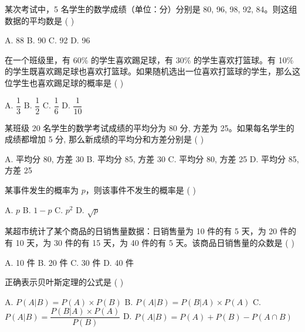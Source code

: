 \documentclass[11pt, a4paper]{article}
\begin{document}

\begin{baitap}[1]
某次考试中，5 名学生的数学成绩（单位：分）分别是 80, 96, 98, 92, 84。则这组数据的平均数是 ( )
\par\vspace{3pt}
\noindent A. 88 \quad B. 90 \quad C. 92 \quad D. 96
\end{baitap}

\begin{baitap}[2]
在一个班级里，有 60\% 的学生喜欢踢足球，有 30\% 的学生喜欢打篮球。有 10\% 的学生既喜欢踢足球也喜欢打篮球。如果随机选出一位喜欢打篮球的学生，那么这位学生也喜欢踢足球的概率是 ( )
\par\vspace{3pt}
\noindent A. $\dfrac{1}{3}$ \quad B. $\dfrac{1}{2}$ \quad C. $\dfrac{1}{6}$ \quad D. $\dfrac{1}{10}$
\end{baitap}

\begin{baitap}[3]
某班级 20 名学生的数学考试成绩的平均分为 80 分, 方差为 25。如果每名学生的成绩都增加 5 分, 那么新成绩的平均分和方差分别是 ( )
\par\vspace{3pt}
\noindent A. 平均分 80, 方差 30 \quad B. 平均分 85, 方差 30 \quad C. 平均分 80, 方差 25 \quad D. 平均分 85, 方差 25
\end{baitap}

\begin{baitap}[4]
某事件发生的概率为 $p$，则该事件不发生的概率是 ( )
\par\vspace{3pt}
\noindent A. $p$ \quad B. $1 - p$ \quad C. $p^{2}$ \quad D. $\sqrt{p}$
\end{baitap}

\begin{baitap}[5]
某超市统计了某个商品的日销售量数据：日销售量为 10 件的有 5 天，为 20 件的有 10 天，为 30 件的有 15 天，为 40 件的有 5 天。该商品日销售量的众数是 ( )
\par\vspace{3pt}
\noindent A. 10 件 \quad B. 20 件 \quad C. 30 件 \quad D. 40 件
\end{baitap}

\begin{baitap}[6]
正确表示贝叶斯定理的公式是 ( )
\par\vspace{3pt}
\noindent A. $P(A|B) = P(A) \times P(B)$ \quad B. $P(A|B) = P(B|A) \times P(A)$ \quad C. $P(A|B) = \dfrac{P(B|A) \times P(A)}{P(B)}$ \quad D. $P(A|B) = P(A) + P(B) - P(A \cap B)$
\end{baitap}
\end{document}
